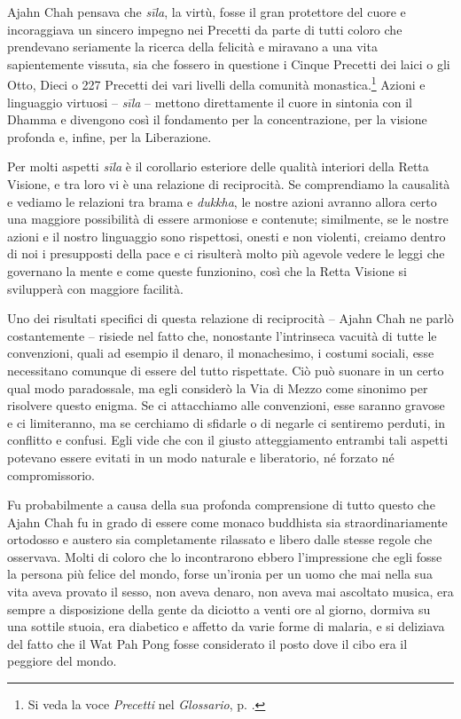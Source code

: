 Ajahn Chah pensava che \emph{sīla}, la virtù, fosse il gran protettore
del cuore e incoraggiava un sincero impegno nei Precetti da parte di
tutti coloro che prendevano seriamente la ricerca della felicità e
miravano a una vita sapientemente vissuta, sia che fossero in questione
i Cinque Precetti dei laici o gli Otto, Dieci o 227 Precetti dei vari
livelli della comunità monastica.\footnote{Si veda la voce
  \emph{Precetti} nel \emph{Glossario}, p. \pageref{glossary-precetti}.} Azioni e linguaggio virtuosi --
\emph{sīla} -- mettono direttamente il cuore in sintonia con il Dhamma e
divengono così il fondamento per la concentrazione, per la visione
profonda e, infine, per la Liberazione.

Per molti aspetti \emph{sīla} è il corollario esteriore delle qualità
interiori della Retta Visione, e tra loro vi è una relazione di
reciprocità. Se comprendiamo la causalità e vediamo le relazioni tra
brama e \emph{dukkha}, le nostre azioni avranno allora certo una
maggiore possibilità di essere armoniose e contenute; similmente, se le
nostre azioni e il nostro linguaggio sono rispettosi, onesti e non
violenti, creiamo dentro di noi i presupposti della pace e ci risulterà
molto più agevole vedere le leggi che governano la mente e come queste
funzionino, così che la Retta Visione si svilupperà con maggiore
facilità.

Uno dei risultati specifici di questa relazione di reciprocità -- Ajahn
Chah ne parlò costantemente -- risiede nel fatto che, nonostante
l'intrinseca vacuità di tutte le convenzioni, quali ad esempio il
denaro, il monachesimo, i costumi sociali, esse necessitano comunque di
essere del tutto rispettate. Ciò può suonare in un certo qual modo
paradossale, ma egli considerò la Via di Mezzo come sinonimo per
risolvere questo enigma. Se ci attacchiamo alle convenzioni, esse
saranno gravose e ci limiteranno, ma se cerchiamo di sfidarle o di
negarle ci sentiremo perduti, in conflitto e confusi. Egli vide che con
il giusto atteggiamento entrambi tali aspetti potevano essere evitati in
un modo naturale e liberatorio, né forzato né compromissorio.

Fu probabilmente a causa della sua profonda comprensione di tutto questo
che Ajahn Chah fu in grado di essere come monaco buddhista sia
straordinariamente ortodosso e austero sia completamente rilassato e
libero dalle stesse regole che osservava. Molti di coloro che lo
incontrarono ebbero l'impressione che egli fosse la persona più felice
del mondo, forse un'ironia per un uomo che mai nella sua vita aveva
provato il sesso, non aveva denaro, non aveva mai ascoltato musica, era
sempre a disposizione della gente da diciotto a venti ore al giorno,
dormiva su una sottile stuoia, era diabetico e affetto da varie forme di
malaria, e si deliziava del fatto che il Wat Pah Pong fosse considerato
il posto dove il cibo era il peggiore del mondo.

